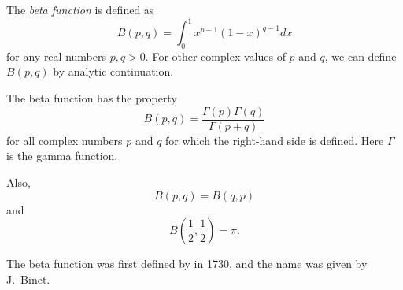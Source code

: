 \documentclass[12pt]{article}
\begin{document}

The \emph{beta function} is defined as
\[
  B(p,q) = \int_0^1 x^{p-1} (1-x)^{q-1} dx
\]
for any real numbers $p,q > 0$.
For other complex values of $p$ and $q$,
we can define $B(p,q)$ by analytic continuation.

The beta function has the property
\[
  B(p,q) = \frac{\Gamma(p) \Gamma(q)}{\Gamma(p+q)}
\]
for all complex numbers $p$ and $q$ for which the right-hand side is defined.
Here $\Gamma$ is the gamma function.

Also,
\[
  B(p,q) = B(q,p)
\]
and
\[
  B({\textstyle\frac{1}{2},\frac{1}{2}}) = \pi.
\]

The beta function was first defined
by  in 1730,
and the name was given by J.~Binet.
\end{document}
